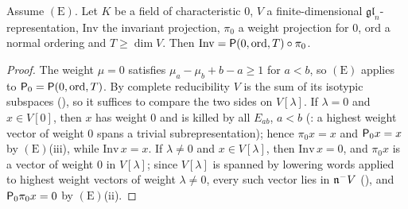 \begin{lemma}\label{pf:sh-curv:invformula}
Assume $(\mathrm E)$. Let $K$ be a field of characteristic $0$, $V$ a finite-dimensional $\mathfrak{gl}_n$-representation,
$\mathrm{Inv}$ the invariant projection, $\pi_0$ a weight projection for $0$, $\mathrm{ord}$ a normal ordering and $T\ge\dim V$.
Then $\mathrm{Inv}=\mathsf P(0,\mathrm{ord},T)\circ\pi_0$.
\end{lemma}

\begin{proof}
The weight $\mu=0$ satisfies $\mu_a-\mu_b+b-a\ge1$ for $a<b$, so $(\mathrm E)$ applies to $\mathsf P_0=\mathsf P(0,\mathrm{ord},T)$.
By complete reducibility $V$ is the sum of its isotypic subspaces
(), so it suffices to compare the two sides
on $V[\lambda]$. If $\lambda=0$ and $x\in V[0]$, then $x$ has weight $0$ and is killed by all $E_{ab}$, $a<b$
(: a highest weight vector of weight $0$
spans a trivial subrepresentation); hence $\pi_0x=x$ and
$\mathsf P_0x=x$ by $(\mathrm E)$(iii), while $\mathrm{Inv}\,x=x$. If $\lambda\ne0$ and $x\in V[\lambda]$, then
$\mathrm{Inv}\,x=0$, and $\pi_0x$ is a vector of weight $0$ in $V[\lambda]$; since $V[\lambda]$ is spanned by lowering words
applied to highest weight vectors of weight $\lambda\ne0$, every such vector lies in $\mathfrak n^- V$
(), and $\mathsf P_0\pi_0x=0$ by
$(\mathrm E)$(ii).
\end{proof}

